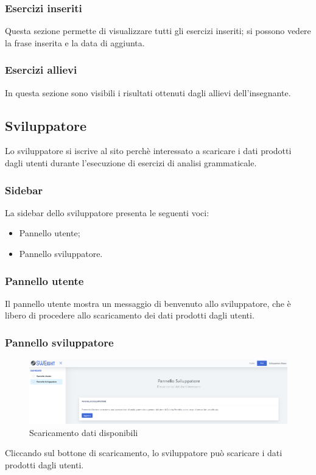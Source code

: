        
        
        \subsubsection{Esercizi inseriti}
        Questa sezione permette di visualizzare tutti gli esercizi inseriti; si possono vedere la frase inserita e la data di aggiunta.
        
        
        
        
        \subsubsection{Esercizi allievi}        
          In questa sezione sono visibili i risultati ottenuti dagli allievi dell'insegnante.
        
        
        
        
	\newpage
    \subsection{Sviluppatore}
    Lo sviluppatore si iscrive al sito perchè interessato a scaricare i dati prodotti dagli utenti durante l'esecuzione di esercizi di analisi grammaticale.
    	\subsubsection{Sidebar} 
    	  La sidebar dello sviluppatore presenta le seguenti voci:
    		\begin{itemize}
    			\item Pannello utente;
    			\item Pannello sviluppatore.
    		\end{itemize}
    
    
    
    
    	\subsubsection{Pannello utente}
    	  Il pannello utente mostra un messaggio di benvenuto allo sviluppatore, che è libero di procedere allo scaricamento dei dati prodotti dagli utenti.



    	\subsubsection{Pannello sviluppatore}
    		\begin{figure}[H]
				\centering
				\includegraphics[width=17cm]{sez/img/sviluppatore/datipronti.PNG}
				\caption{Scaricamento dati disponibili}\label{fig:1}
			\end{figure}
		  Cliccando sul bottone di scaricamento, lo sviluppatore può scaricare i dati prodotti dagli utenti.




